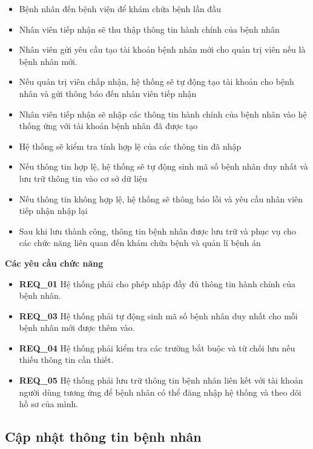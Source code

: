 \begin{itemize}

\item Bệnh nhân đến bệnh viện để khám chữa bệnh lần đầu
\item Nhân viên tiếp nhận sẽ thu thập thông tin hành chính của bệnh nhân 
\item Nhân viên gửi yêu cầu tạo tài khoản bệnh nhân mới cho quản trị viên nếu là bệnh nhân mới.
\item Nếu quản trị viên chấp nhận, hệ thống sẽ tự động tạo tài khoản cho bệnh nhân và gửi thông báo đến nhân viên tiếp nhận
\item Nhân viên tiếp nhận sẽ nhập các thông tin hành chính của bệnh nhân vào hệ thống ứng với tài khoản bệnh nhân đã được tạo
\item Hệ thống sẽ kiểm tra tính hợp lệ của các thông tin đã nhập
\item Nếu thông tin hợp lệ, hệ thống sẽ tự động sinh mã số bệnh nhân duy nhất và lưu trữ thông tin vào cơ sở dữ liệu
\item Nếu thông tin không hợp lệ, hệ thống sẽ thông báo lỗi và yêu cầu nhân viên tiếp nhận nhập lại
\item Sau khi lưu thành công, thông tin bệnh nhân được lưu trữ và phục vụ cho các chức năng liên quan đến khám chữa bệnh và quản lí bệnh án

\end{itemize}

\noindent \textbf{Các yêu cầu chức năng}

\begin{itemize}

\item \textbf{REQ\_01} Hệ thống phải cho phép nhập đầy đủ thông tin hành chính của bệnh nhân.

\item \textbf{REQ\_03} Hệ thống phải tự động sinh mã số bệnh nhân duy nhất cho mỗi bệnh nhân mới được thêm vào.

\item \textbf{REQ\_04} Hệ thống phải kiểm tra các trường bắt buộc và từ chối lưu nếu thiếu thông tin cần thiết.

\item \textbf{REQ\_05} Hệ thống phải lưu trữ thông tin bệnh nhân liên kết với tài khoản người dùng tương ứng để bệnh nhân có thể đăng nhập hệ thống và theo dõi hồ sơ của mình.

\end{itemize}

\subsection{Cập nhật thông tin bệnh nhân}

